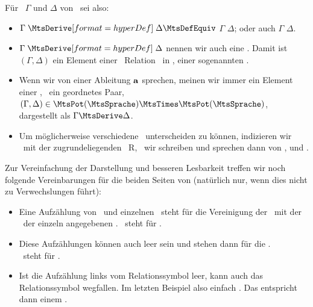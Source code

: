 Für \Teilmengen\ $\Gamma$ und $\Delta$ von \MtsSprache\ sei also:
\begin{itemize}
	\item $\Gamma \defSymBin{\MtsDerive} \Delta \MtsDefEquiv$ $\Gamma$  $\Delta$; oder auch $\Gamma$  $\Delta$.
	\item $\Gamma \defSymBin{\MtsDerive} \Delta$ nennen wir auch eine   \MtsSprache.
	Damit ist $(\Gamma,\Delta)$ ein Element einer \binaeren\ Relation \MtsDerive\ in \MtsPotSprache, einer sogenannten .
	\item Wenn wir von einer Ableitung $\mathbf{a}$ sprechen, meinen wir immer ein Element einer \Ableitungsrelation, \textdh\ ein geordnetes Paar, \textzB\ $(\Gamma, \Delta) \in \MtsPotSprache \MtsTimes \MtsPotSprache$, dargestellt als $\Gamma \MtsDerive \Delta$.
	\item Um möglicherweise verschiedene \Ableitungsrelationen\ unterscheiden zu können, indizieren wir  \textggf\ mit der zugrundeliegenden \Relation\ R, \textdh\ wir schreiben  und sprechen dann von ,  und .
\end{itemize}
%
Zur Vereinfachung der Darstellung und besseren Lesbarkeit treffen wir noch folgende Vereinbarungen für die beiden Seiten von \seqqt{$\Gamma \MtsDerive \Delta$} (natürlich nur, wenn dies nicht zu Verwechslungen führt):
\begin{itemize}
	\item Eine Aufzählung von \Formelmengen\ und einzelnen \Formeln\ steht für die Vereinigung der \Formelmengen\ mit der \Menge\ der einzeln angegebenen \Formeln.
	\textZB\ steht \seqqt{$\Gamma, \alpha \MtsDerive \beta$} für \seqqt{$(\Gamma \MtsCup \{\alpha\}) \MtsDerive \{\beta\}$}.
	\item Diese Aufzählungen können auch leer sein und stehen dann für die \leereMenge.
	\\\textZB\ steht \seqqt{$\MtsDerive\; \alpha \OjkImp (\beta \OjkImp \alpha)$} für \seqqt{$\MtsEmptyset \MtsDerive \{\alpha \OjkImp (\beta \OjkImp \alpha)\}$}.
	\item Ist die Aufzählung links vom Relationssymbol \chrqt{\MtsDerive} leer, kann auch das Relationssymbol wegfallen.
	Im letzten Beispiel also einfach \seqqt{$\{\alpha \OjkImp (\beta \OjkImp \alpha)\}$}.
	Das entspricht dann einem .
\end{itemize}
